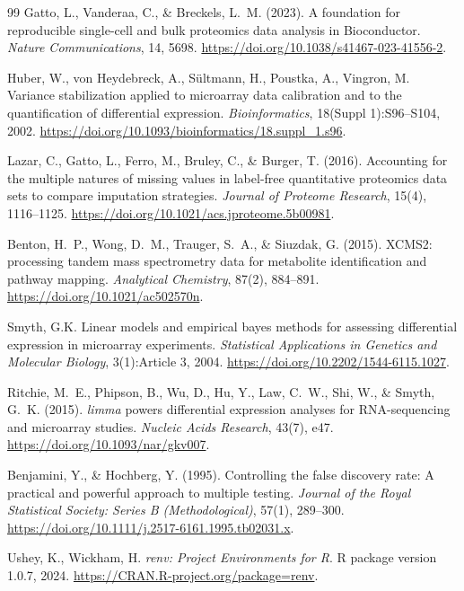 \documentclass[11pt,twoside,openright]{book}
\begin{document}
\begin{thebibliography}{99}
Gatto, L., Vanderaa, C., \& Breckels, L.~M. (2023). A foundation for reproducible single-cell and bulk proteomics data analysis in Bioconductor. \textit{Nature Communications}, 14, 5698. \url{https://doi.org/10.1038/s41467-023-41556-2}.

Huber, W., von Heydebreck, A., S\"ultmann, H., Poustka, A., Vingron, M.
\newblock Variance stabilization applied to microarray data calibration and to the quantification of differential expression.
\newblock \emph{Bioinformatics}, 18(Suppl 1):S96--S104, 2002.
\newblock \url{https://doi.org/10.1093/bioinformatics/18.suppl_1.s96}.

Lazar, C., Gatto, L., Ferro, M., Bruley, C., \& Burger, T. (2016). Accounting for the multiple natures of missing values in label-free quantitative proteomics data sets to compare imputation strategies. \textit{Journal of Proteome Research}, 15(4), 1116--1125. \url{https://doi.org/10.1021/acs.jproteome.5b00981}.

Benton, H.~P., Wong, D.~M., Trauger, S.~A., \& Siuzdak, G. (2015). XCMS2: processing tandem mass spectrometry data for metabolite identification and pathway mapping. \textit{Analytical Chemistry}, 87(2), 884--891. \url{https://doi.org/10.1021/ac502570n}.

Smyth, G.K.
\newblock Linear models and empirical bayes methods for assessing differential expression in microarray experiments.
\newblock \emph{Statistical Applications in Genetics and Molecular Biology}, 3(1):Article 3, 2004.
\newblock \url{https://doi.org/10.2202/1544-6115.1027}.

Ritchie, M.~E., Phipson, B., Wu, D., Hu, Y., Law, C.~W., Shi, W., \& Smyth, G.~K. (2015). \textit{limma} powers differential expression analyses for RNA-sequencing and microarray studies. \textit{Nucleic Acids Research}, 43(7), e47. \url{https://doi.org/10.1093/nar/gkv007}.

Benjamini, Y., \& Hochberg, Y. (1995). Controlling the false discovery rate: A practical and powerful approach to multiple testing. \textit{Journal of the Royal Statistical Society: Series B (Methodological)}, 57(1), 289--300. \url{https://doi.org/10.1111/j.2517-6161.1995.tb02031.x}.

Ushey, K., Wickham, H.
\newblock \emph{renv: Project Environments for R}.
\newblock R package version 1.0.7, 2024.
\newblock \url{https://CRAN.R-project.org/package=renv}.


\end{thebibliography}
\end{document}
